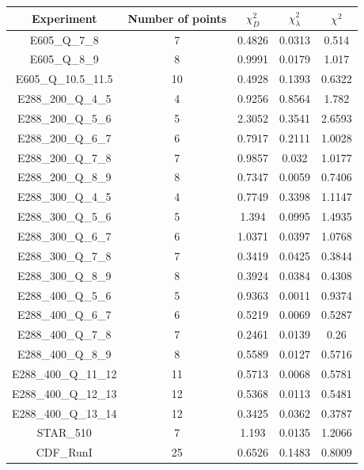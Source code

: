 \documentclass[
]{article}
\begin{document}
\begin{table}[h]

\centering

\begin{tabular}{|c|c|c|c|c|} \hline

\textbf{Experiment} & \textbf{Number of
points} & \textbf{\(\chi_{D}^2\)} & \textbf{\(\chi_{\lambda}^2\)} & \textbf{\(\chi^2\)} \\ \hline

E605\_Q\_7\_8 & 7 & 0.4826 & 0.0313 & 0.514 \\ \hline
E605\_Q\_8\_9 & 8 & 0.9991 & 0.0179 & 1.017 \\ \hline
E605\_Q\_10.5\_11.5 & 10 & 0.4928 & 0.1393 & 0.6322 \\ \hline
E288\_200\_Q\_4\_5 & 4 & 0.9256 & 0.8564 & 1.782 \\ \hline
E288\_200\_Q\_5\_6 & 5 & 2.3052 & 0.3541 & 2.6593 \\ \hline
E288\_200\_Q\_6\_7 & 6 & 0.7917 & 0.2111 & 1.0028 \\ \hline
E288\_200\_Q\_7\_8 & 7 & 0.9857 & 0.032 & 1.0177 \\ \hline
E288\_200\_Q\_8\_9 & 8 & 0.7347 & 0.0059 & 0.7406 \\ \hline
E288\_300\_Q\_4\_5 & 4 & 0.7749 & 0.3398 & 1.1147 \\ \hline
E288\_300\_Q\_5\_6 & 5 & 1.394 & 0.0995 & 1.4935 \\ \hline
E288\_300\_Q\_6\_7 & 6 & 1.0371 & 0.0397 & 1.0768 \\ \hline
E288\_300\_Q\_7\_8 & 7 & 0.3419 & 0.0425 & 0.3844 \\ \hline
E288\_300\_Q\_8\_9 & 8 & 0.3924 & 0.0384 & 0.4308 \\ \hline
E288\_400\_Q\_5\_6 & 5 & 0.9363 & 0.0011 & 0.9374 \\ \hline
E288\_400\_Q\_6\_7 & 6 & 0.5219 & 0.0069 & 0.5287 \\ \hline
E288\_400\_Q\_7\_8 & 7 & 0.2461 & 0.0139 & 0.26 \\ \hline
E288\_400\_Q\_8\_9 & 8 & 0.5589 & 0.0127 & 0.5716 \\ \hline
E288\_400\_Q\_11\_12 & 11 & 0.5713 & 0.0068 & 0.5781 \\ \hline
E288\_400\_Q\_12\_13 & 12 & 0.5368 & 0.0113 & 0.5481 \\ \hline
E288\_400\_Q\_13\_14 & 12 & 0.3425 & 0.0362 & 0.3787 \\ \hline
STAR\_510 & 7 & 1.193 & 0.0135 & 1.2066 \\ \hline
CDF\_RunI & 25 & 0.6526 & 0.1483 & 0.8009 \\ \hline

\end{tabular}
\end{table}
\end{document}
